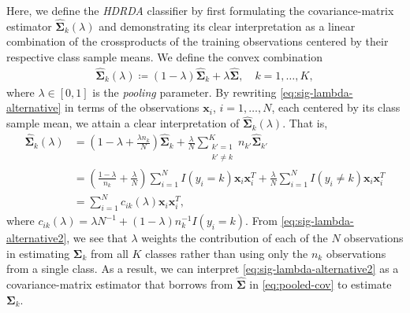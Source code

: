 \documentclass[]{interact}\usepackage[]{graphicx}\usepackage[]{color}
\begin{document}
Here, we define the \emph{HDRDA} classifier by first formulating the
covariance-matrix estimator $\widehat{\bm \Sigma}_k(\lambda)$ and demonstrating
its clear interpretation as a linear combination of the crossproducts of the
training observations centered by their respective class sample means. We define
the convex combination
\begin{align}
  \widehat{\bm \Sigma}_k(\lambda) \coloneqq (1 - \lambda) \widehat{\bm \Sigma}_k + \lambda
  \widehat{\bm \Sigma}, \quad k = 1, \ldots, K,\label{eq:sig-lambda-alternative}
\end{align}
where $\lambda \in [0, 1]$ is the \emph{pooling} parameter. By rewriting
\eqref{eq:sig-lambda-alternative} in terms of the observations $\bm x_i$, $i =
1, \ldots, N$, each centered by its class sample mean, we attain a clear
interpretation of $\widehat{\bm \Sigma}_k(\lambda)$. That is,
\begin{align}
	\widehat{\bm \Sigma}_k(\lambda)
  &= \left( 1 - \lambda + \frac{\lambda n_k}{N} \right) \widehat{\bm \Sigma}_k +  \frac{\lambda}{N} \sum_{\substack{k' = 1\\k' \ne k}}^K n_{k'} \widehat{\bm \Sigma}_{k'} \nonumber \\
	&= \left( \frac{1 - \lambda}{n_k} + \frac{\lambda}{N} \right)\sum_{i=1}^N
  I(y_i = k) \bm x_i \bm x_i^{T} +  \frac{\lambda}{N} \sum_{i=1}^N I(y_i \ne k)
  \bm x_i \bm x_i^{T} \nonumber \\
	&= \sum_{i=1}^N c_{ik}(\lambda) \bm x_i \bm x_i^{T},\label{eq:sig-lambda-alternative2}
\end{align}
where $c_{ik}(\lambda) = \lambda N^{-1} + (1 - \lambda)n_k^{-1}I(y_i = k)$.
From \eqref{eq:sig-lambda-alternative2}, we see that $\lambda$ weights the
contribution of each of the $N$ observations in estimating $\bm \Sigma_k$ from
all $K$ classes rather than using only the $n_k$ observations from a single
class. As a result, we can interpret \eqref{eq:sig-lambda-alternative2} as a
covariance-matrix estimator that borrows from $\widehat{\bm \Sigma}$ in
\eqref{eq:pooled-cov} to estimate $ \bm \Sigma_k$.
\end{document}
